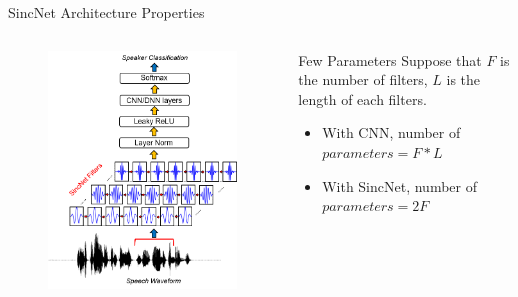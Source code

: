 \documentclass[notheorems, aspectratio=54]{beamer}
\begin{document}
\begin{frame}{SincNet Architecture Properties}
	\begin{columns}
		\begin{column}{0.47\textwidth}
			\begin{figure}[H]
				\includegraphics[width=0.9\linewidth]{images/SincNet.png}
			\end{figure}
		\end{column}
		\begin{column}{0.5\textwidth}
			Few Parameters \newline
			Suppose that $F$ is the number of filters, $L$ is the length of each filters.
			\begin{itemize}
				\item With CNN, number of $parameters = F * L$
				\item With SincNet, number of $parameters = 2F$
			\end{itemize}
		\end{column}
	\end{columns}
\end{frame}
\end{document}
